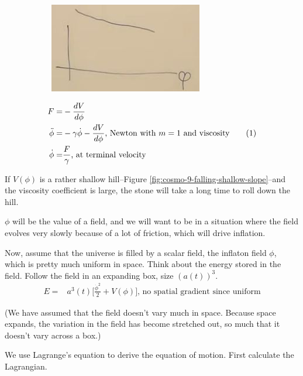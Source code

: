 \documentclass[]{article}
\newcommand\numberthis{\addtocounter{equation}{1}\tag{\theequation}}
\begin{document}
\begin{figure}[H]
\begin{subfigure}[t]{0.45\textwidth}
		\includegraphics[width=\textwidth]{cosmo-9-falling-shallow-slope}
	\end{subfigure}
\end{figure}

\begin{align*}
	F =& - \frac{d V}{d\phi}\\
	\ddot{\phi} =& - \gamma \dot{\phi} - \frac{d V}{d\phi} \text{, Newton with $m=1$ and viscosity} \numberthis \label{eq:falling:stone}\\
	\dot{\phi} =& \frac{F}{\gamma} \text{, at terminal velocity}
\end{align*}

If $V(\phi)$ is a rather shallow hill--Figure \ref{fig:cosmo-9-falling-shallow-slope}--and the viscosity coefficient is large, the stone will take a long time to roll down the hill.

$\phi$ will be the value of a field, and we will want to be in a situation where the field evolves very slowly because of a lot of friction, which will drive inflation.

Now, assume that the universe is filled by a scalar field, the inflaton field $\phi$, which is pretty much uniform in space. Think about the energy stored in the field. Follow the field in an expanding box, size $(a(t))^3$.
\begin{align*}
	E =& a^3(t)\big[\frac{\dot{\phi}^2}{2} + V(\phi)\big]\text{, no spatial gradient since uniform}
\end{align*}

(We have assumed that the field doesn't vary much in space. Because space expands, the variation in the field has become stretched out, so much that it doesn't vary across a box.)

We use Lagrange's equation to derive the equation of motion. First calculate the Lagrangian.
\end{document}
